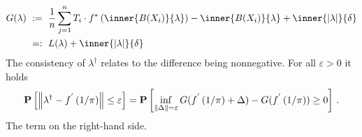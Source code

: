  \begin{align*}
   G(\lambda)
   &
   \ 
   :=
   \ 
      \frac{1}{n}
      \sum_{j = 1}^{n} 
        T_i
        \cdot
        f^* 
        \left( 
          \inner
          {B(X_i)}
          {\lambda}
        \right)
      -
          \inner
          {B(X_i)}
          {\lambda}
      +
      \inner
      { | \lambda | }
      { \delta }
      \\
   &
   \ 
   =:
   \ 
      L( \lambda )
      +
      \inner
      { | \lambda | }
      { \delta }
 \end{align*} 
 The consistency of 
 $
  \lambda ^ \dagger
 $
 relates to the difference being nonnegative.
 For all 
 $
  \varepsilon > 0
 $
 it holds
 \begin{gather}
   \mathbf{P}
   \left[ 
     \left\lVert
      \lambda ^ \dagger
      -
      f ^ { ' }
      \left( 
        1 / \pi 
      \right)
     \right\rVert
     \le
     \varepsilon
   \right]
   =
   \mathbf{P}
   \left[ 
     \inf _ { \left\lVert\Delta\right\rVert = \varepsilon }
     G
     (
      f ^ { ' }
      \left( 
        1 / \pi 
      \right)
      +
      \Delta
     )
     -
     G
     (
      f ^ { ' }
      \left( 
        1 / \pi 
      \right)
     )
     \ge 
     0
   \right]
   \,.
 \end{gather}
 The term on the right-hand side.
